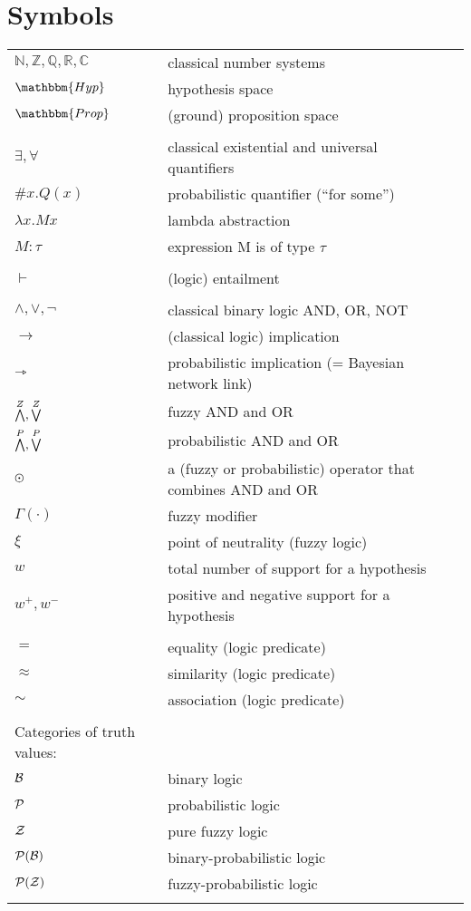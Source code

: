 \chapter*{Symbols}
\begin{tabular*}{0.9\textwidth}{llr}
$\mathbb{N,Z,Q,R,C}$ & classical number systems & \tabularnewline
$\mathbbm{Hyp}$ & hypothesis space & \tabularnewline
$\mathbbm{Prop}$ & (ground) proposition space & \tabularnewline
\\

$\exists, \forall$  & classical existential and universal quantifiers & \tabularnewline
$\#x. Q(x)$ & probabilistic quantifier ({}``for some'') & \tabularnewline
$\lambda x. M x$ & lambda abstraction & \tabularnewline
$M:\tau$ & expression M is of type $\tau$ & \tabularnewline
\\

$\vdash$ & (logic) entailment & \tabularnewline
\\

$\wedge, \vee, \neg$ & classical binary logic AND, OR, NOT & \tabularnewline
$\rightarrow$ & (classical logic) implication & \tabularnewline
$\rightarrowtriangle$ & probabilistic implication (= Bayesian network link) & \tabularnewline
$\stackrel{Z}{\bigwedge}, \stackrel{Z}{\bigvee}$ & fuzzy AND and OR & \tabularnewline
$\stackrel{P}{\bigwedge}, \stackrel{P}{\bigvee} $ & probabilistic AND and OR & \tabularnewline
$\varodot$ & a (fuzzy or probabilistic) operator that combines AND and OR & \tabularnewline
$\Gamma(\cdotp)$ & fuzzy modifier & \tabularnewline
$\xi$ & point of neutrality (fuzzy logic) & \tabularnewline
$w$ & total number of support for a hypothesis & \tabularnewline
$w^+, w^-$ & positive and negative support for a hypothesis & \tabularnewline
\\

$=$ & equality (logic predicate) & \tabularnewline
$\approx$ & similarity (logic predicate) & \tabularnewline
$\sim$ & association (logic predicate) & \tabularnewline
\\

Categories of truth values:\\
$\mathcal{B}$ & binary logic & \tabularnewline
$\mathcal{P}$ & probabilistic logic & \tabularnewline
$\mathcal{Z}$ & pure fuzzy logic & \tabularnewline
$\mathcal{P(B)}$ & binary-probabilistic logic & \tabularnewline
$\mathcal{P(Z)}$ & fuzzy-probabilistic logic & \tabularnewline
 &  & \tabularnewline
\end{tabular*}

